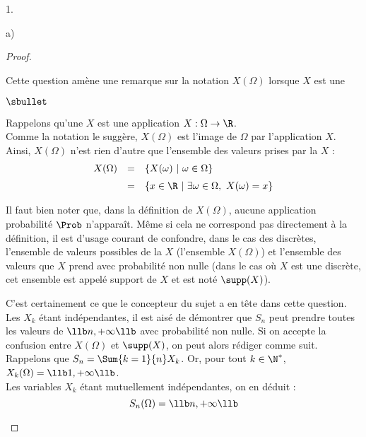 \documentclass[11pt]{article}%
\begin{document}
\begin{noliste}{1.}
\begin{noliste}{a)}
\begin{proof}
      \begin{remark}%
        Cette question amène une remarque sur la notation $X(\Omega)$
        lorsque $X$ est une \var
        \begin{noliste}{$\sbullet$}
        \item Rappelons qu'une \var $X$ est une application $X :
          \Omega \to \R$.\\
          Comme la notation le suggère, $X(\Omega)$ est l'image de
          $\Omega$ par l'application $X$. \\
          Ainsi, $X(\Omega)$ n'est rien d'autre que l'ensemble des
          valeurs prises par la \var $X$ :
          \[
          \begin{array}{rcl}
            X(\Omega) & = & \{ X(\omega) \ | \ \omega \in \Omega\}
            \\[.2cm]
            & = & \{ x \in \R \ | \ \exists \omega \in \Omega, \ X(\omega) =
            x \}
          \end{array}
          \]
        \item Il faut bien noter que, dans la définition de
          $X(\Omega)$, aucune application probabilité $\Prob$
          n'apparaît. Même si cela ne correspond pas directement à la
          définition, il est d'usage courant de confondre, dans le cas
          des \var discrètes, l'ensemble de valeurs possibles de la
          \var $X$ (\ie l'ensemble $X(\Omega)$) et l'ensemble des
          valeurs que $X$ prend avec probabilité non nulle (dans le
          cas où $X$ est une \var discrète, cet ensemble est appelé
          support de $X$ et est noté $\supp(X)$).
        \item C'est certainement ce que le concepteur du sujet a en
          tête dans cette question. Les \var $X_k$ étant
          indépendantes, il est aisé de démontrer que $S_n$ peut
          prendre toutes les valeurs de $\llb n, +\infty \llb$ avec
          probabilité non nulle. Si on accepte la confusion entre
          $X(\Omega)$ et $\supp(X)$, on peut alors rédiger comme suit.\\[.1cm]
          Rappelons que $S_n = \Sum{k=1}{n} X_k$. Or, pour tout $k \in
          \N^*$, $X_k(\Omega) = \llb 1, +\infty \llb$.\\
          Les variables $X_k$ étant mutuellement indépendantes, on en
          déduit :
          \[
          S_n(\Omega) = \llb n, +\infty \llb
          \]

\end{noliste}
\end{remark}
\end{proof}
\end{noliste}
\end{noliste}
\end{document}
